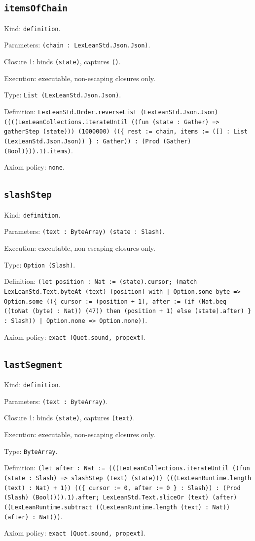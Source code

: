 \documentclass[11pt]{article}
\begin{document}
\subsection*{\texttt{itemsOfChain}}
\noindent Kind: \texttt{definition}.\par
\noindent Parameters: \texttt{(chain : LexLeanStd.Json.Json)}.\par
\noindent Closure 1: binds \texttt{(state)}, captures \texttt{()}.\par
\noindent Execution: executable, non-escaping closures only.\par
\noindent Type: \texttt{List (LexLeanStd.Json.Json)}.\par
\noindent Definition: \texttt{LexLeanStd.Order.reverseList (LexLeanStd.Json.Json) ((((LexLeanCollections.iterateUntil ((fun (state : Gather) => gatherStep (state))) (1000000) ((\{ rest := chain, items := ([] : List (LexLeanStd.Json.Json)) \} : Gather)) : (Prod (Gather) (Bool)))).1).items)}.\par
\noindent Axiom policy: \texttt{none}.\par
\subsection*{\texttt{slashStep}}
\noindent Kind: \texttt{definition}.\par
\noindent Parameters: \texttt{(text : ByteArray) (state : Slash)}.\par
\noindent Execution: executable, non-escaping closures only.\par
\noindent Type: \texttt{Option (Slash)}.\par
\noindent Definition: \texttt{(let position : Nat := (state).cursor; (match LexLeanStd.Text.byteAt (text) (position) with | Option.some byte => Option.some ((\{ cursor := (position + 1), after := (if (Nat.beq ((toNat (byte) : Nat)) (47)) then (position + 1) else (state).after) \} : Slash)) | Option.none => Option.none))}.\par
\noindent Axiom policy: \texttt{exact [Quot.sound, propext]}.\par
\subsection*{\texttt{lastSegment}}
\noindent Kind: \texttt{definition}.\par
\noindent Parameters: \texttt{(text : ByteArray)}.\par
\noindent Closure 1: binds \texttt{(state)}, captures \texttt{(text)}.\par
\noindent Execution: executable, non-escaping closures only.\par
\noindent Type: \texttt{ByteArray}.\par
\noindent Definition: \texttt{(let after : Nat := (((LexLeanCollections.iterateUntil ((fun (state : Slash) => slashStep (text) (state))) (((LexLeanRuntime.length (text) : Nat) + 1)) ((\{ cursor := 0, after := 0 \} : Slash)) : (Prod (Slash) (Bool)))).1).after; LexLeanStd.Text.sliceOr (text) (after) ((LexLeanRuntime.subtract ((LexLeanRuntime.length (text) : Nat)) (after) : Nat)))}.\par
\noindent Axiom policy: \texttt{exact [Quot.sound, propext]}.\par
\end{document}
